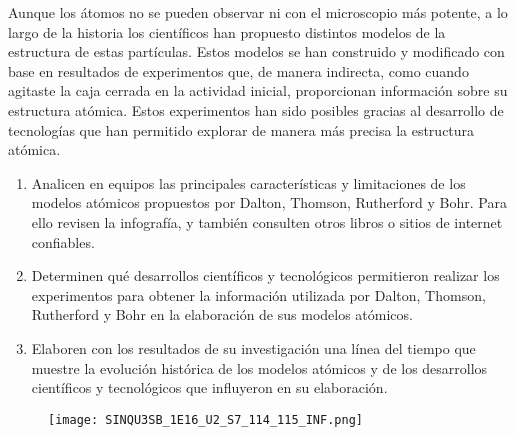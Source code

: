 \begin{boxK}

    \begin{boxF}
        Aunque los átomos no se pueden observar ni con el microscopio más potente,
        a lo largo de la historia los científicos han propuesto distintos modelos
        de la estructura de estas partículas. Estos modelos se han construido y
        modificado con base en resultados de experimentos que, de manera indirecta,
        como cuando agitaste la caja cerrada en la actividad inicial, proporcionan
        información sobre su estructura atómica. Estos experimentos han sido posibles
        gracias al desarrollo de tecnologías que han permitido explorar de manera
        más precisa la estructura atómica.
    \end{boxF}
    \begin{enumerate}
        \item Analicen en equipos las principales características y limitaciones
              de los modelos atómicos propuestos por Dalton, Thomson, Rutherford y Bohr.
              Para ello revisen la infografía, y también consulten otros libros o sitios
              de internet confiables.
        \item Determinen qué desarrollos científicos y tecnológicos permitieron
              realizar los experimentos para obtener la información utilizada por Dalton,
              Thomson, Rutherford y Bohr en la elaboración de sus modelos atómicos.
        \item Elaboren con los resultados de su investigación una línea del tiempo que
              muestre la evolución histórica de los modelos atómicos y de los desarrollos
              científicos y tecnológicos que influyeron en su elaboración.
    \end{enumerate}
\end{boxK}
\newpage
\begin{landscape}
    \thispagestyle{plain}
    \begin{figure}[H]
        \centering
        \texttt{[image: SINQU3SB\_1E16\_U2\_S7\_114\_115\_INF.png]}
        \label{fig:SINFI2SB_1E16_U1_S4_b_info}
    \end{figure}
\end{landscape}
\newpage
